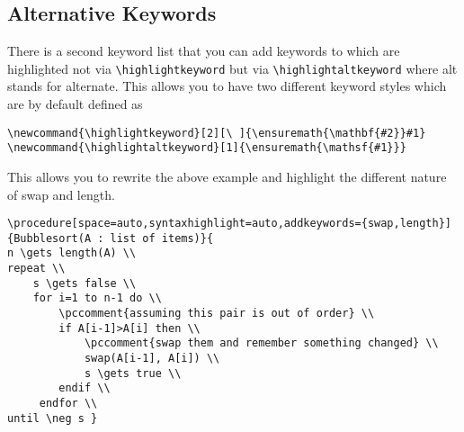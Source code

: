\documentclass[a4paper]{report}
\begin{document}
\subsection{Alternative Keywords}
There is a second keyword list that you can add keywords to which are highlighted not via \lstinline$\highlightkeyword$ but via \lstinline$\highlightaltkeyword$
where alt stands for alternate. This allows you to have two different keyword styles which are by default defined as
\begin{lstlisting}
\newcommand{\highlightkeyword}[2][\ ]{\ensuremath{\mathbf{#2}}#1}
\newcommand{\highlightaltkeyword}[1]{\ensuremath{\mathsf{#1}}}
\end{lstlisting}
This allows you to rewrite the above example and highlight the different nature of swap and length.
\begin{center}
\end{center}
\begin{lstlisting}
\procedure[space=auto,syntaxhighlight=auto,addkeywords={swap,length}]{Bubblesort(A : list of items)}{
n \gets length(A) \\
repeat \\
    s \gets false \\
    for i=1 to n-1 do \\
        \pccomment{assuming this pair is out of order} \\
        if A[i-1]>A[i] then \\
            \pccomment{swap them and remember something changed} \\
            swap(A[i-1], A[i]) \\
            s \gets true \\
        endif \\
     endfor \\
until \neg s }
\end{lstlisting}
\end{document}
